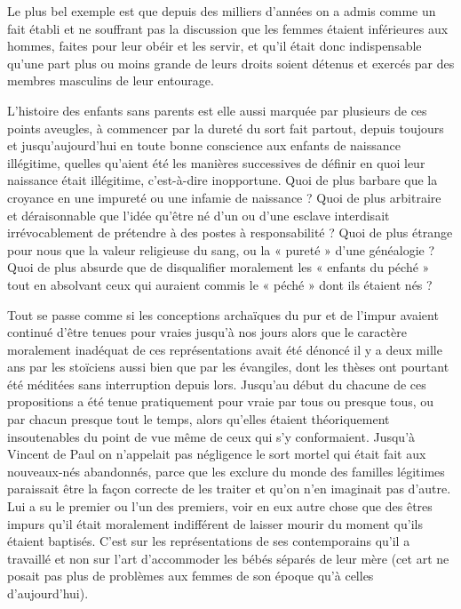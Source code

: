 Le plus bel exemple est que depuis des milliers d'années on a admis comme un fait établi et ne souffrant pas la discussion que les femmes étaient inférieures aux hommes, faites pour leur obéir et les servir, et qu'il était donc indispensable qu'une part plus ou moins grande de leurs droits soient détenus et exercés par des membres masculins de leur entourage. 

 L'histoire des enfants sans parents est elle aussi marquée par plusieurs de ces points aveugles, à commencer par la dureté du sort fait partout, depuis toujours et jusqu'aujourd'hui en toute bonne conscience aux enfants de naissance illégitime, quelles qu'aient été les manières successives de définir en quoi leur naissance était illégitime, c'est-à-dire inopportune. Quoi de plus barbare que la croyance en une impureté ou une infamie de naissance ? Quoi de plus arbitraire et déraisonnable que l'idée qu'être né d'un ou d'une esclave interdisait irrévocablement de prétendre à des postes à responsabilité ? Quoi de plus étrange pour nous que la valeur religieuse du sang, ou la « pureté » d'une généalogie ? Quoi de plus absurde que de disqualifier moralement les « enfants du péché » tout en absolvant ceux qui auraient commis le « péché » dont ils étaient nés ? 

 Tout se passe comme si les conceptions archaïques du pur et de l'impur avaient continué d'être tenues pour vraies jusqu'à nos jours alors que le caractère moralement inadéquat de ces représentations avait été dénoncé il y a deux mille ans par les stoïciens aussi bien que par les évangiles, dont les thèses ont pourtant été méditées sans interruption depuis lors. Jusqu'au début du  chacune de ces propositions a été tenue pratiquement pour vraie par tous ou presque tous, ou par chacun presque tout le temps, alors qu'elles étaient théoriquement insoutenables du point de vue même de ceux qui s'y conformaient. Jusqu'à Vincent de Paul on n'appelait pas négligence le sort mortel qui était fait aux nouveaux-nés abandonnés, parce que les exclure du monde des familles légitimes paraissait être la façon correcte de les traiter et qu'on n'en imaginait pas d'autre. Lui a su le premier ou l'un des premiers, voir en eux autre chose que des êtres impurs qu'il était moralement indifférent de laisser mourir du moment qu'ils étaient baptisés. C'est sur les représentations de ses contemporains qu'il a travaillé et non sur l'art d'accommoder les bébés séparés de leur mère (cet art ne posait pas plus de problèmes aux femmes de son époque qu'à celles d'aujourd'hui). 

